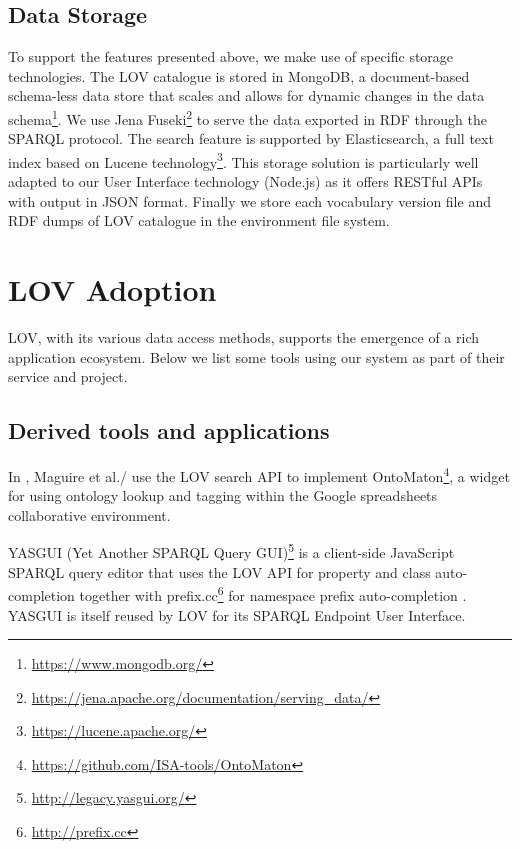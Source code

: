 \documentclass{iosart2c}
\begin{document}
\subsection{Data Storage}

To support the features presented above, we make use of specific storage technologies. The LOV catalogue is stored in MongoDB\textregistered, a document-based schema-less data store that scales and allows for dynamic changes in the data schema\footnote{\url{https://www.mongodb.org/}}. We use Jena Fuseki\footnote{\url{https://jena.apache.org/documentation/serving_data/}} to serve the data exported in RDF through the SPARQL protocol. The search feature is supported by Elasticsearch\textregistered, a full text index based on Lucene technology\footnote{\url{https://lucene.apache.org/}}. This storage solution is particularly well adapted to our User Interface technology (Node.js) as it offers RESTful APIs with output in JSON format. Finally we store each vocabulary version file and RDF dumps of LOV catalogue in the environment file system.


\section{LOV Adoption}\label{sec:lovecosystem}
LOV, with its various data access methods, supports the emergence of a rich application ecosystem. Below we list some tools using our system as part of their service and project.
 
\subsection{Derived tools and applications}

In \cite{ontomaton12}, Maguire et al./ use the LOV search API to implement OntoMaton\footnote{\url{https://github.com/ISA-tools/OntoMaton}}, a widget for using ontology lookup and tagging within the Google spreadsheets collaborative environment. 

YASGUI (Yet Another SPARQL Query GUI)\footnote{\url{http://legacy.yasgui.org/}} is a client-side JavaScript SPARQL query editor that uses the LOV API for property and class auto-completion together with prefix.cc\footnote{\url{http://prefix.cc}} for namespace prefix auto-completion \cite{yasgui}. YASGUI is itself reused by LOV for its SPARQL Endpoint User Interface.
\end{document}
